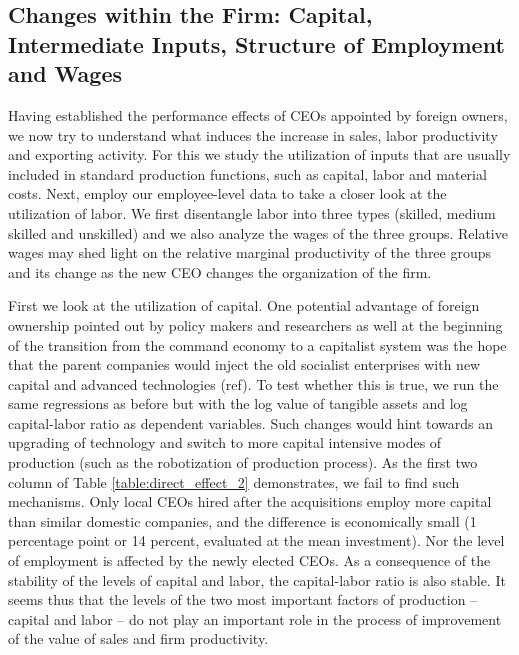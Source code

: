 \documentclass[12pt,a4paper]{article}
\begin{document}
\subsection{Changes within the Firm: Capital, Intermediate Inputs, Structure of Employment and Wages}
Having established the performance effects of CEOs appointed by foreign owners, we now try to understand what induces the increase in sales, labor productivity and exporting activity. For this we study the utilization of inputs that are usually included in standard production functions, such as capital, labor and material costs. Next, employ our employee-level data to take a closer look at the utilization of labor. We first disentangle labor into three types (skilled, medium skilled and unskilled) and we also analyze the wages of the three groups. Relative wages may shed light on the relative marginal productivity of the three groups and its change as the new CEO changes the organization of the firm.

First we look at the utilization of capital. One potential advantage of foreign ownership pointed out by policy makers and researchers as well at the beginning of the transition from the command economy to a capitalist system was the hope that the parent companies would inject the old socialist enterprises with new capital and advanced technologies (ref). To test whether this is true, we run the same regressions as before but with the log value of tangible assets and log capital-labor ratio as dependent variables. Such changes would hint towards an upgrading of technology and switch to more capital intensive modes of production (such as the robotization of production process). As the first two column of Table \ref{table:direct_effect_2} demonstrates, we fail to find such mechanisms. Only local CEOs hired after the acquisitions employ more capital than similar domestic companies, and the difference is economically small (1 percentage point or 14 percent, evaluated at the mean investment). Nor the level of employment is affected by the newly elected CEOs. As a consequence of the stability of the levels of capital and labor, the capital-labor ratio is also stable. It seems thus that the levels of the two most important factors of production -- capital and labor -- do not play an important role in the process of improvement of the value of sales and firm productivity.
\end{document}
